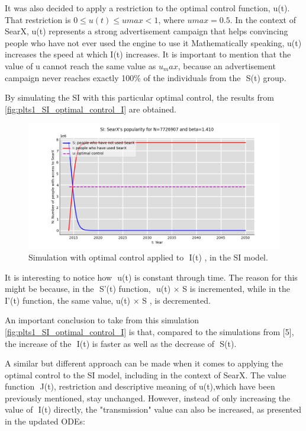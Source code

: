 \documentclass{article}
\begin{document}
It‌‌ was‌‌ also‌‌ decided‌‌ to‌‌ apply‌‌ a‌‌ restriction‌‌ to‌‌ the‌‌ optimal‌‌ control‌‌ function,‌‌ u(t). ‌‌That‌‌ restriction‌‌ is $0 \le u(t) \le umax < 1$‌‌,‌ ‌where‌ $umax=0.5$.‌ ‌In‌ ‌the‌ ‌context‌ ‌of‌ ‌SearX,‌ ‌u(t) ‌represents‌ ‌a‌ ‌strong‌‌ advertisement‌‌ campaign‌‌ that‌‌ helps‌‌ convincing‌‌ people‌‌ who‌‌ have not ever‌‌ used‌‌ the‌‌ engine‌‌ to‌‌ use‌‌ it ‌‌Mathematically‌‌ speaking,‌‌ u(t) ‌increases‌‌ the‌‌ speed‌‌ at‌‌ which‌‌ I(t) ‌increases.‌‌ It‌‌ is‌‌ important‌‌ to‌‌ mention‌ ‌that‌ ‌the‌ ‌value‌ ‌of‌ u ‌cannot‌‌ reach‌‌ the‌‌ same‌‌ value‌‌ as‌‌ $u_max$,‌‌ because‌‌ an‌‌ advertisement‌‌ campaign‌ ‌never‌ ‌reaches‌ ‌exactly‌ ‌100\% ‌of‌ ‌the‌ ‌individuals‌ ‌from‌ ‌the‌ ‌ S(t) ‌group.‌‌

By‌ ‌simulating‌ ‌the‌ ‌SI‌ ‌with‌ ‌this‌ ‌particular‌ ‌optimal‌ ‌control,‌ ‌the‌ ‌results‌ ‌from‌ \autoref{fig:plts1_SI_optimal_control_I}‌ ‌are‌ ‌obtained.‌ ‌

\begin{figure}[h]
    \centering
    \includegraphics[width=0.8\linewidth]{plts1_SI_optimal_control_I}
    \caption{‌Simulation‌ ‌with‌ ‌optimal‌ ‌control‌ ‌applied‌ ‌to‌ ‌ I(t) ,‌ ‌in‌ ‌the‌ ‌SI‌ ‌model.‌‌‌}
    \label{fig:plts1_SI_optimal_control_I}
\end{figure}

It‌ ‌is‌ ‌interesting‌ ‌to‌ ‌notice‌ ‌how‌ ‌ u(t) ‌is‌ ‌constant‌ ‌through‌ ‌time.‌ ‌The‌ ‌reason‌ ‌for‌ ‌this‌ ‌might‌ ‌be‌‌ because,‌ ‌in‌ ‌the‌ ‌ S'(t) ‌function,‌ ‌ u(t) × S ‌is‌ ‌incremented,‌ ‌while‌ ‌in‌ ‌the‌ ‌ I'(t) ‌function,‌ ‌the‌ ‌same‌‌ value,‌ u(t) × S ,‌ ‌is‌ ‌decremented.‌

An‌ ‌important‌ ‌conclusion‌ ‌to‌ ‌take‌ ‌from‌ ‌this‌ ‌simulation‌ ‌\autoref{fig:plts1_SI_optimal_control_I}‌ ‌is‌ ‌that,‌ ‌compared‌ ‌to‌ ‌the‌‌ simulations‌ ‌from‌ ‌[5],‌ ‌the‌ ‌increase‌ ‌of‌ ‌the‌ ‌ I(t) ‌is‌ ‌faster‌ ‌as‌ ‌well‌ ‌as‌ ‌the‌ ‌decrease‌ ‌of‌ ‌ S(t).‌

A‌ ‌similar‌ ‌but‌ ‌different‌‌ approach‌‌ can‌‌ be‌‌ made‌‌ when‌‌ it‌‌ comes‌‌ to‌‌ applying‌‌ the‌‌ optimal‌‌ control‌‌ to‌‌ the‌ ‌SI‌ ‌model,‌ ‌including‌ ‌in‌ ‌the‌ ‌context‌ ‌of‌ ‌SearX.‌ ‌The‌ ‌value‌ ‌function‌ ‌ J(t),‌ ‌restriction‌ ‌and‌‌ descriptive‌‌ meaning‌‌ of‌‌ u(t),‌‌which‌‌ have‌‌ been‌‌ previously‌‌ mentioned,‌‌ stay‌‌ unchanged.‌‌ However,‌‌ instead‌ ‌of‌ ‌only‌ ‌increasing‌ ‌the‌ ‌value‌ ‌of‌ ‌ I(t) ‌directly,‌ ‌the‌ "transmission" ‌value‌ ‌can‌ ‌also‌ ‌be‌‌ increased,‌ ‌as‌ ‌presented‌ ‌in‌ ‌the‌ ‌updated‌ ‌ODEs:‌
\end{document}
